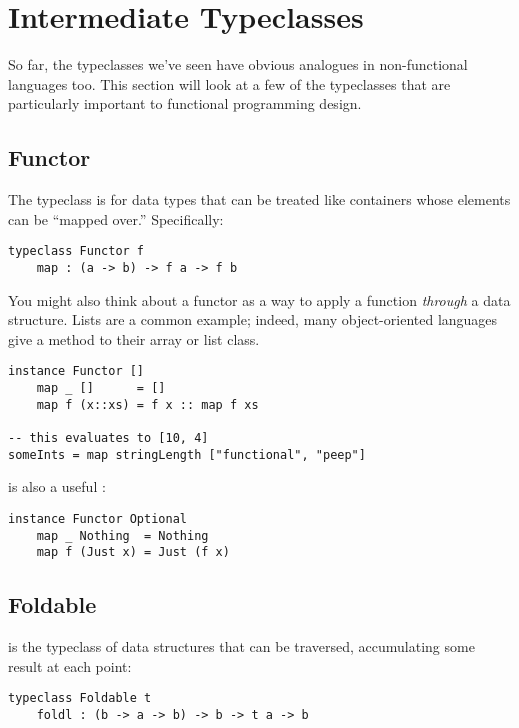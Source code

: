 
\chapter{Intermediate Typeclasses}

So far, the typeclasses we've seen have obvious analogues in non-functional languages too. This section will look at a few of the typeclasses that are particularly important to functional programming design.

\section{Functor}

The  typeclass is for data types that can be treated like containers whose elements can be ``mapped over.'' Specifically:

\begin{lstlisting}[language=pseudoml]
typeclass Functor f
    map : (a -> b) -> f a -> f b
\end{lstlisting}

You might also think about a functor as a way to apply a function \emph{through} a data structure. Lists are a common example; indeed, many object-oriented languages give a  method to their array or list class.

\begin{lstlisting}[language=pseudoml]
instance Functor []
    map _ []      = []
    map f (x::xs) = f x :: map f xs

-- this evaluates to [10, 4]
someInts = map stringLength ["functional", "peep"]
\end{lstlisting}

 is also a useful :

\begin{lstlisting}[language=pseudoml]
instance Functor Optional
    map _ Nothing  = Nothing
    map f (Just x) = Just (f x)
\end{lstlisting}

\section{Foldable}

 is the typeclass of data structures that can be traversed, accumulating some result at each point:

\begin{lstlisting}[language=pseudoml]
typeclass Foldable t
    foldl : (b -> a -> b) -> b -> t a -> b
\end{lstlisting}

